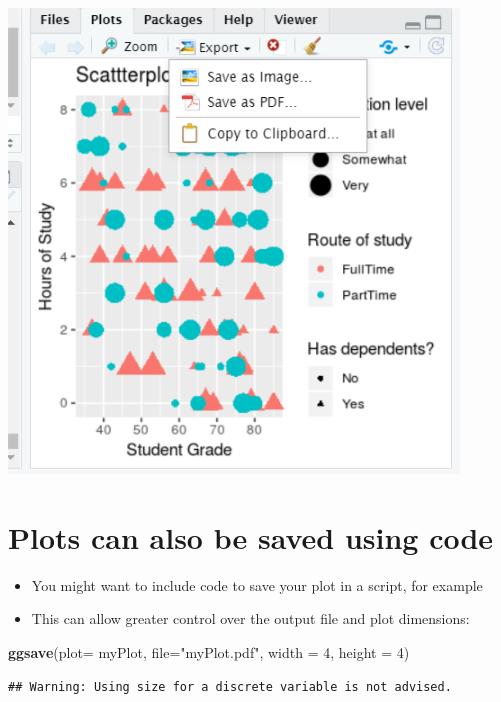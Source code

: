 \documentclass[
]{book}
\newenvironment{Shaded}{\begin{snugshade}}{\end{snugshade}}
\newcommand{\DataTypeTok}[1]{\textcolor[rgb]{0.13,0.29,0.53}{#1}}
\newcommand{\DecValTok}[1]{\textcolor[rgb]{0.00,0.00,0.81}{#1}}
\newcommand{\KeywordTok}[1]{\textcolor[rgb]{0.13,0.29,0.53}{\textbf{#1}}}
\newcommand{\NormalTok}[1]{#1}
\newcommand{\StringTok}[1]{\textcolor[rgb]{0.31,0.60,0.02}{#1}}
\providecommand{\tightlist}{%
  \setlength{\itemsep}{0pt}\setlength{\parskip}{0pt}}
\begin{document}
\includegraphics[width=1\linewidth]{img/savePlot1}

\hypertarget{plots-can-also-be-saved-using-code}{%
\section{Plots can also be saved using code}\label{plots-can-also-be-saved-using-code}}

\begin{itemize}
\tightlist
\item
  You might want to include code to save your plot in a script, for example
\item
  This can allow greater control over the output file and plot dimensions:
\end{itemize}

\begin{Shaded}
\begin{Highlighting}[]
\KeywordTok{ggsave}\NormalTok{(}\DataTypeTok{plot=}\NormalTok{ myPlot, }\DataTypeTok{file=}\StringTok{"myPlot.pdf"}\NormalTok{, }\DataTypeTok{width =} \DecValTok{4}\NormalTok{, }\DataTypeTok{height =} \DecValTok{4}\NormalTok{)}
\end{Highlighting}
\end{Shaded}

\begin{verbatim}
## Warning: Using size for a discrete variable is not advised.
\end{verbatim}
\end{document}
